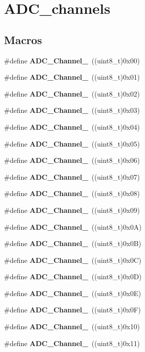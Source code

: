 \section{A\+D\+C\+\_\+channels}
\label{group__ADC__channels}
\subsection*{Macros}
\begin{DoxyCompactItemize}
\item 
\#define \textbf{ A\+D\+C\+\_\+\+Channel\+\_}~((uint8\+\_\+t)0x00)
\item 
\#define \textbf{ A\+D\+C\+\_\+\+Channel\+\_}~((uint8\+\_\+t)0x01)
\item 
\#define \textbf{ A\+D\+C\+\_\+\+Channel\+\_}~((uint8\+\_\+t)0x02)
\item 
\#define \textbf{ A\+D\+C\+\_\+\+Channel\+\_}~((uint8\+\_\+t)0x03)
\item 
\#define \textbf{ A\+D\+C\+\_\+\+Channel\+\_}~((uint8\+\_\+t)0x04)
\item 
\#define \textbf{ A\+D\+C\+\_\+\+Channel\+\_}~((uint8\+\_\+t)0x05)
\item 
\#define \textbf{ A\+D\+C\+\_\+\+Channel\+\_}~((uint8\+\_\+t)0x06)
\item 
\#define \textbf{ A\+D\+C\+\_\+\+Channel\+\_}~((uint8\+\_\+t)0x07)
\item 
\#define \textbf{ A\+D\+C\+\_\+\+Channel\+\_}~((uint8\+\_\+t)0x08)
\item 
\#define \textbf{ A\+D\+C\+\_\+\+Channel\+\_}~((uint8\+\_\+t)0x09)
\item 
\#define \textbf{ A\+D\+C\+\_\+\+Channel\+\_}~((uint8\+\_\+t)0x0\+A)
\item 
\#define \textbf{ A\+D\+C\+\_\+\+Channel\+\_}~((uint8\+\_\+t)0x0\+B)
\item 
\#define \textbf{ A\+D\+C\+\_\+\+Channel\+\_}~((uint8\+\_\+t)0x0\+C)
\item 
\#define \textbf{ A\+D\+C\+\_\+\+Channel\+\_}~((uint8\+\_\+t)0x0\+D)
\item 
\#define \textbf{ A\+D\+C\+\_\+\+Channel\+\_}~((uint8\+\_\+t)0x0\+E)
\item 
\#define \textbf{ A\+D\+C\+\_\+\+Channel\+\_}~((uint8\+\_\+t)0x0\+F)
\item 
\#define \textbf{ A\+D\+C\+\_\+\+Channel\+\_}~((uint8\+\_\+t)0x10)
\item 
\#define \textbf{ A\+D\+C\+\_\+\+Channel\+\_}~((uint8\+\_\+t)0x11)

\end{DoxyCompactItemize}
